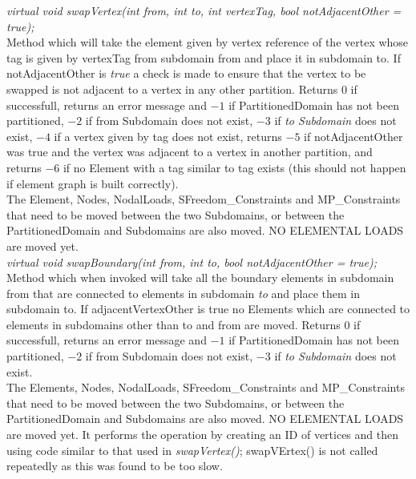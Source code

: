 {\em virtual void swapVertex(int from, int to, int vertexTag, bool
notAdjacentOther = true); } \\ 
Method which will take the element given by vertex reference of the
vertex whose tag is given by \p vertexTag from subdomain \p from
and place it in subdomain \p to. If \p notAdjacentOther is {\em
true} a check is made to ensure that the vertex to be swapped is not
adjacent to a vertex in any other partition. Returns $0$ if
successfull, returns an error message and $-1$ if PartitionedDomain
has not been partitioned, $-2$ if \p from Subdomain does not exist,
$-3$ if {\em to Subdomain} does not exist, $-4$ if a vertex given by
\p tag does not exist, returns $-5$ if \p notAdjacentOther was
true and the vertex was adjacent to a vertex in another partition, and
returns $-6$ if no Element with a tag similar to \p tag exists
(this should not happen if element graph is built correctly). \\
The Element, Nodes, NodalLoads, SFreedom\_Constraints and MP\_Constraints
that need to be moved between the two Subdomains, or between the
PartitionedDomain and Subdomains are also moved. NO ELEMENTAL LOADS 
are moved yet. \\


{\em virtual void swapBoundary(int from, int to, bool notAdjacentOther
= true); } \\ 
Method which when invoked will take all the boundary elements in
subdomain \p from that are connected to elements in subdomain {\em
to} and place them in subdomain \p to. If \p adjacentVertexOther is
\p true no Elements which are connected to elements in subdomains other 
than \p to and \p from are moved. Returns $0$ if successfull, returns 
an error message and $-1$ if PartitionedDomain has not been partitioned, $-2$ 
if \p from Subdomain does not exist, $-3$ if {\em to Subdomain}
does not exist. \\ The Elements, Nodes, NodalLoads, SFreedom\_Constraints
and MP\_Constraints that need to be moved between the two Subdomains,
or between the PartitionedDomain and Subdomains are also moved. NO
ELEMENTAL LOADS are moved yet. It performs the operation by creating
an ID of vertices and then using code similar to that used in {\em
swapVertex()}; swapVErtex() is not called repeatedly as this was
found to be too slow. \\ 

